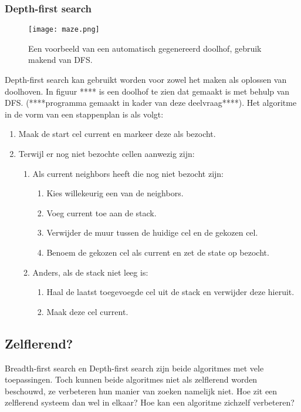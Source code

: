 \subsubsection{Depth-first search}
\begin{figure}[h]
  \centering
    \texttt{[image: maze.png]}
  \caption{Een voorbeeld van een automatisch gegenereerd doolhof, gebruik makend van DFS.}
  \label{fig:maze}
\end{figure}

Depth-first search kan gebruikt worden voor zowel het maken als oplossen van doolhoven. In figuur **** is een doolhof te zien dat gemaakt is met behulp van DFS. (****programma gemaakt in kader van deze deelvraag****). Het algoritme in de vorm van een stappenplan is als volgt:

\begin{enumerate}
\item Maak de start cel current en markeer deze als bezocht.\blindtext
\item Terwijl er nog niet bezochte cellen aanwezig zijn:
	\begin{enumerate}
	\item Als current neighbors heeft die nog niet bezocht zijn:
		\begin{enumerate}
		\item Kies willekeurig een van de neighbors.
		\item Voeg current toe aan de stack.
		\item Verwijder de muur tussen de huidige cel en de gekozen cel.
		\item Benoem de gekozen cel als current en zet de state op bezocht.
		\end{enumerate}			
	\blindtext
	\item Anders, als de stack niet leeg is:
		\begin{enumerate}
		\item Haal de laatst toegevoegde cel uit de stack en verwijder deze hieruit.
		\item Maak deze cel current.
		\end{enumerate}	
	\blindtext
	\end{enumerate}
\blindtext
\end{enumerate}
\subsection{Zelflerend?}
Breadth-first search en Depth-first search zijn beide algoritmes met vele toepassingen. Toch kunnen beide algoritmes niet als zelflerend worden beschouwd, ze verbeteren hun manier van zoeken namelijk niet. Hoe zit een zelflerend systeem dan wel in elkaar? Hoe kan een algoritme zichzelf verbeteren?

